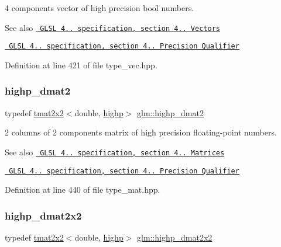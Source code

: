 4 components vector of high precision bool numbers.

\begin{DoxySeeAlso}{See also}
\href{http://www.opengl.org/registry/doc/GLSLangSpec.4.20.8.pdf}{\texttt{ G\+L\+SL 4.. specification, section 4.. Vectors}} 

\href{http://www.opengl.org/registry/doc/GLSLangSpec.4.20.8.pdf}{\texttt{ G\+L\+SL 4.. specification, section 4.. Precision Qualifier}} 
\end{DoxySeeAlso}


Definition at line 421 of file type\+\_\+vec.\+hpp.

\mbox{\label{group__core__precision_ga08cc902dad76205cd28a80bf695814a7}} 
\subsubsection{\texorpdfstring{highp\_dmat2}{highp\_dmat2}}
{\footnotesize\ttfamily typedef \mbox{\hyperlink{structglm_1_1tmat2x2}{tmat2x2}}$<$double, \mbox{\hyperlink{namespaceglm_a0f04f086094c747d227af4425893f545ac6f7eab42eacbb10d59a58e95e362074}{highp}}$>$ \mbox{\hyperlink{group__core__precision_ga08cc902dad76205cd28a80bf695814a7}{glm\+::highp\+\_\+dmat2}}}

2 columns of 2 components matrix of high precision floating-\/point numbers.

\begin{DoxySeeAlso}{See also}
\href{http://www.opengl.org/registry/doc/GLSLangSpec.4.20.8.pdf}{\texttt{ G\+L\+SL 4.. specification, section 4.. Matrices}} 

\href{http://www.opengl.org/registry/doc/GLSLangSpec.4.20.8.pdf}{\texttt{ G\+L\+SL 4.. specification, section 4.. Precision Qualifier}} 
\end{DoxySeeAlso}


Definition at line 440 of file type\+\_\+mat.\+hpp.

\mbox{\label{group__core__precision_gaf0445ee32625d26bf79bb84e3d5a5502}} 
\subsubsection{\texorpdfstring{highp\_dmat2x2}{highp\_dmat2x2}}
{\footnotesize\ttfamily typedef \mbox{\hyperlink{structglm_1_1tmat2x2}{tmat2x2}}$<$double, \mbox{\hyperlink{namespaceglm_a0f04f086094c747d227af4425893f545ac6f7eab42eacbb10d59a58e95e362074}{highp}}$>$ \mbox{\hyperlink{group__core__precision_gaf0445ee32625d26bf79bb84e3d5a5502}{glm\+::highp\+\_\+dmat2x2}}}

